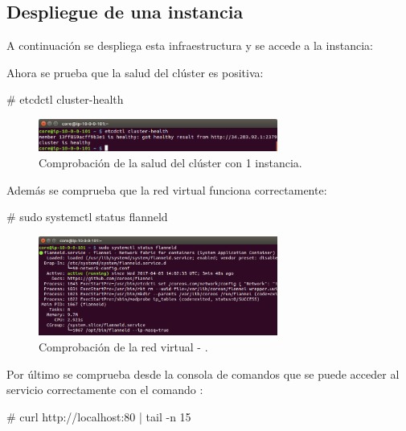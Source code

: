 \subsection{Despliegue de una instancia}

A continuación se despliega esta infraestructura y se accede a la instancia:


Ahora se prueba que la salud del clúster es positiva:

\begin{code}
# etcdctl cluster-health
\end{code}

\begin{figure}[H]
\centering
\includegraphics[width=0.7\textwidth]{images/figures/cluster-health-aws-1.png}
\caption{Comprobación de la salud del clúster con 1 instancia.}
\end{figure}

Además se comprueba que la red virtual funciona correctamente:

\begin{code}
# sudo systemctl status flanneld
\end{code}

\begin{figure}[H]
\centering
\includegraphics[width=0.7\textwidth]{images/figures/flanneld-aws-1.png}
\caption{Comprobación de la red virtual - .}
\end{figure}

Por último se comprueba desde la consola de comandos que se puede acceder al servicio correctamente con el comando :

\begin{code}
# curl http://localhost:80 | tail -n 15
\end{code}

